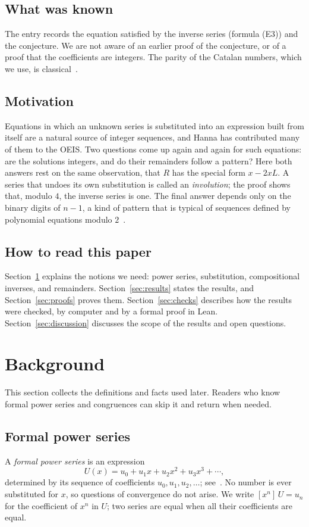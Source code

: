 \documentclass[11pt,a4paper]{article}
\theoremstyle{definition}
\theoremstyle{remark}
\newcommand{\coeff}[2]{[x^{#1}]\,#2}
\begin{document}
\subsection{What was known}
The entry records the equation satisfied by the inverse series (formula (E3)) and the conjecture. We are not aware of an
earlier proof of the conjecture, or of a proof that the coefficients are integers. The parity of the Catalan numbers,
which we use, is classical~\cite{deutschsagan}.

\subsection{Motivation}
Equations in which an unknown series is substituted into an expression built from itself are a natural source of
integer sequences, and Hanna has contributed many of them to the OEIS. Two questions come up again and again for such
equations: are the solutions integers, and do their remainders follow a pattern? Here both answers rest on the same
observation, that $R$ has the special form $x-2xL$. A series that undoes its own substitution is called an
\emph{involution}; the proof shows that, modulo $4$, the inverse series is one. The final answer depends only
on the binary digits of $n-1$, a kind of pattern that is typical of sequences defined by polynomial equations modulo
$2$~\cite{allouche,christol}.

\subsection{How to read this paper}
Section~\ref{sec:background} explains the notions we need: power series, substitution, compositional inverses, and
remainders. Section~\ref{sec:results} states the results, and Section~\ref{sec:proofs} proves them.
Section~\ref{sec:checks} describes how the results were checked, by computer and by a formal proof in Lean.
Section~\ref{sec:discussion} discusses the scope of the results and open questions.
\section{Background}\label{sec:background}
This section collects the definitions and facts used later. Readers who know formal power series and congruences can skip it and return when needed.
\subsection{Formal power series}
A \emph{formal power series} is an expression
\[
U(x)=u_0+u_1x+u_2x^2+u_3x^3+\cdots ,
\]
determined by its sequence of coefficients $u_0,u_1,u_2,\dots$; see~\cite{niven,stanley}. No number is ever
substituted for $x$, so questions of convergence do not arise. We write $\coeff{n}{U}=u_n$ for the coefficient of $x^n$ in $U$; two series are equal
when all their coefficients are equal.
\end{document}
